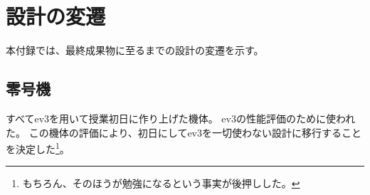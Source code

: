 \documentclass{ltjsreport}
\begin{document}
\appendix






\chapter{設計の変遷}
本付録では、最終成果物に至るまでの設計の変遷を示す。

\section{零号機}
すべてev3を用いて授業初日に作り上げた機体。
ev3の性能評価のために使われた。
この機体の評価により、初日にしてev3を一切使わない設計に移行することを決定した\footnote{もちろん、そのほうが勉強になるという事実が後押しした。}。
\end{document}
